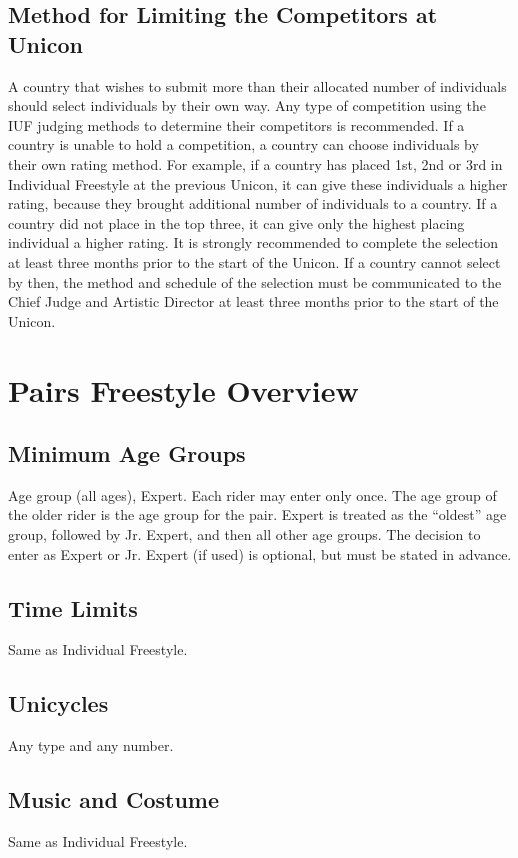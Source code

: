 \subsection{Method for Limiting the Competitors at Unicon}
A country that wishes to submit more than their allocated number of individuals should select individuals by their own way.
Any type of competition using the IUF judging methods to determine their competitors is recommended.
If a country is unable to hold a competition, a country can choose individuals by their own rating method.
For example, if a country has placed 1st, 2nd or 3rd in Individual Freestyle at the previous Unicon, it can give these individuals a higher rating, because they brought additional number of individuals to a country.
If a country did not place in the top three, it can give only the highest placing individual a higher rating.
It is strongly recommended to complete the selection at least three months prior to the start of the Unicon.
If a country cannot select by then, the method and schedule of the selection must be communicated to the Chief Judge and Artistic Director at least three months prior to the start of the Unicon.

\section{Pairs Freestyle Overview}

\subsection{Minimum Age Groups}
Age group (all ages), Expert.
Each rider may enter only once.
The age group of the older rider is the age group for the pair.
Expert is treated as the ``oldest'' age group, followed by Jr. Expert, and then all other age groups.
The decision to enter as Expert or Jr. Expert (if used) is optional, but must be stated in advance.

\subsection{Time Limits}
Same as Individual Freestyle.

\subsection{Unicycles}
Any type and any number.

\subsection{Music and Costume}
Same as Individual Freestyle.

